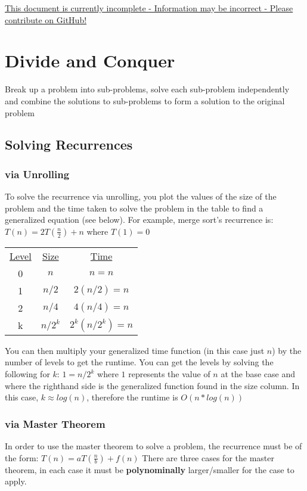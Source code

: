 \documentclass{article}
\begin{document}
\underline{This document is currently incomplete - Information may be incorrect - Please contribute on GitHub!}
\section{Divide and Conquer}
Break up a problem into sub-problems, solve each sub-problem independently and combine the solutions to sub-problems to form a
solution to the original problem
\subsection{Solving Recurrences}
\subsubsection{via Unrolling}
To solve the recurrence via unrolling, you plot the values of the size of the problem and
the time taken to solve the problem in the table to find a generalized equation (see below). For example,
merge sort's recurrence is: $T(n) = 2T(\frac{n}{2}) + n$ where $T(1) = 0$

\begin{multicols}{2}
\begin{center}
    \begin{tabular}{c c c}
        \underline{Level} & \underline{Size} & \underline{Time} \\
        0 & $n$ & $n = n$ \\
        1 & $n/2$ & $2(n/2) = n$ \\
        2 & $n/4$ & $4(n/4) = n$ \\
        k & $n/2^k$ & $2^k(n/2^k) = n$ \\
    \end{tabular}
\end{center}
\columnbreak
You can then multiply your generalized time function (in this case just $n$) by the number of levels
to get the runtime. You can get the levels by solving the following for $k$: $1 = n/2^k$ where $1$ represents the value of $n$
at the base case and where the righthand side is the generalized function found in the size column.
In this case, $k \approx log(n)$, therefore the runtime is $O(n*log(n))$
\end{multicols}
\subsubsection{via Master Theorem}
In order to use the master theorem to solve a problem, the recurrence must be of the form:
$T(n) = aT(\frac{n}{b})+f(n)$
There are three cases for the master theorem, in each case it must be \textbf{polynominally} larger/smaller for the case to apply.
\end{document}
